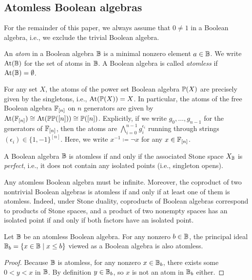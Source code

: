\documentclass{amsart}
\begin{document}
    \subsection{Atomless Boolean algebras}
    
    \begin{Hyp}\label{hyp:nontrivial}
        For the remainder of this paper, we always assume that $0 \ne 1$ in a Boolean algebra, i.e., we exclude the trivial Boolean algebra.
    \end{Hyp}
    
    \begin{Def}\label{def:atoms}
        An \emph{atom} in a Boolean algebra $\mathbb{B}$ is a minimal nonzero element $a \in \mathbb{B}$. We write $\operatorname{At}(\mathbb{B})$ for the set of atoms in $\mathbb{B}$. A Boolean algebra is called \emph{atomless} if $\operatorname{At}(\mathbb{B}) = \emptyset$.
    \end{Def}
    
    \begin{Exa}\label{exa:atomsFn} 
        For any set $X$, the atoms of the power set Boolean algebra $\mathbb{P}(X)$ are precisely given by the singletons, i.e., $\operatorname{At}(\mathbb{P}(X)) = X$. In particular, the atoms of the free Boolean algebra $\mathbb{F}_{[n]}$ on $n$ generators are given by $\operatorname{At}(\mathbb{F}_{[n]}) \cong \operatorname{At}(\mathbb{P}\mathbb{P}([n])) \cong \mathbb{P}([n])$. Explicitly, if we write $g_0,\ldots,g_{n-1}$ for the generators of $\mathbb{F}_{[n]}$, then the atoms are $\bigwedge_{i=0}^{n-1} g_i^{\epsilon_i}$ running through strings  $(\epsilon_i) \in \{1,-1\}^{[n]}$. Here, we write $x^{-1} \coloneqq \neg x$ for any $x \in \mathbb{F}_{[n]}$.  
    \end{Exa}
    \begin{Rem}\label{rem:isolated-points}
        A Boolean algebra $\mathbb{B}$ is atomless if and only if the associated Stone space $X_{\mathbb{B}}$ is \emph{perfect}, i.e., it does not contain any isolated points (i.e., singleton opens). 
    \end{Rem}    
    \begin{Rem}\label{rem:atomlessinfinity}
        Any atomless Boolean algebra must be infinite. Moreover, the coproduct of two nontrivial Boolean algebras is atomless if and only if at least one of them is atomless. Indeed, under Stone duality, coproducts of Boolean algebras correspond to products of Stone spaces, and a product of two nonempty spaces has an isolated point if and only if both factors have an isolated point.
    \end{Rem}   
    \begin{Lem}\label{lem:atomlessprincipalideal}
        Let $\mathbb{B}$ be an atomless Boolean algebra. For any nonzero $b \in \mathbb{B}$, the principal ideal $\mathbb{B}_b = \{x \in \mathbb{B}\mid x \leq b\}$ viewed as a Boolean algebra is also atomless. 
    \end{Lem}
    \begin{proof}
        Because $\mathbb{B}$ is atomless, for any nonzero $x \in \mathbb{B}_{b}$, there exists some $0 < y < x$ in $\mathbb{B}$. By definition $y \in \mathbb{B}_{b}$, so $x$ is not an atom in $\mathbb{B}_b$ either. 
    \end{proof}
    
\end{document}
